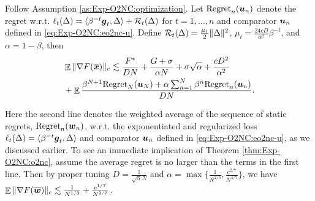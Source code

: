 \begin{theorem}
\label{thm:Exp-O2NC:o2nc}
Follow Assumption \ref{as:Exp-O2NC:optimization}. Let $\mathrm{Regret}_n({\boldsymbol{u}}_n)$ denote the regret w.r.t. $\ell_t(\Delta)=\langle\beta^{-t}{\boldsymbol{g}}_t,\Delta\rangle + {\cal R}_t(\Delta)$ for $t=1,\ldots,n$ and comparator ${\boldsymbol{u}}_n$ defined in \eqref{eq:Exp-O2NC:eo2nc-u}. Define ${\cal R}_t(\Delta) = \frac{\mu_t}{2}\|\Delta\|^2$, $\mu_t = \frac{24cD}{\alpha^2}\beta^{-t}$, and $\alpha=1-\beta$, then
\begin{align*}
    &\mathop{\mathbb{E}} \|\nabla F(\overline{{\boldsymbol{x}}})\|_c
    \lesssim \frac{F^*}{DN} + \frac{G+\sigma}{\alpha N} + \sigma\sqrt{\alpha} + \frac{c D^2}{\alpha^2} \\
    & + \mathop{\mathbb{E}}\frac{\beta^{N+1}\mathrm{Regret}_N({\boldsymbol{u}}_N) + \alpha \sum_{n=1}^N \beta^n \mathrm{Regret}_n({\boldsymbol{u}}_n)}{DN}.
\end{align*}
\end{theorem}

Here the second line denotes the weighted average of the sequence of static regrets, $\mathrm{Regret}_n({\boldsymbol{w}}_n)$, w.r.t. the exponentiated and regularized loss $\ell_t(\Delta) = \langle \beta^{-t}{\boldsymbol{g}}_t,\Delta\rangle$ and comparator ${\boldsymbol{u}}_n$ defined in \eqref{eq:Exp-O2NC:eo2nc-u}, as we discussed earlier. To see an immediate implication of Theorem \ref{thm:Exp-O2NC:o2nc}, assume the average regret is no larger than the terms in the first line. Then by proper tuning $D=\frac{1}{\sqrt{\alpha} N}$ and $\alpha=\max\{\frac{1}{N^{2/3}}, \frac{c^{2/7}}{N^{4/7}}\}$, we have $\mathop{\mathbb{E}}\|\nabla F(\overline{{\boldsymbol{w}}})\|_c \lesssim \frac{1}{N^{1/3}} + \frac{c^{1/7}}{N^{2/7}}$.


